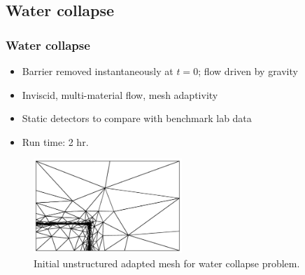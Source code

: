 \subsection{Water collapse}

\begin{frame}
    \frametitle{Water collapse}
\begin{itemize}
\item Barrier removed instantaneously at $t = 0$; flow driven by gravity
\item Inviscid, multi-material flow, mesh adaptivity
\item Static detectors to compare with benchmark lab data
\item Run time: 2 hr.
\end{itemize}

\begin{figure}
\centering
\includegraphics[width=0.5\textwidth, clip=true]{./water_collapse/water_collapse_0_mesh.pdf}
\caption{Initial unstructured adapted mesh for water collapse problem.}
\end{figure}

\end{frame}
%
